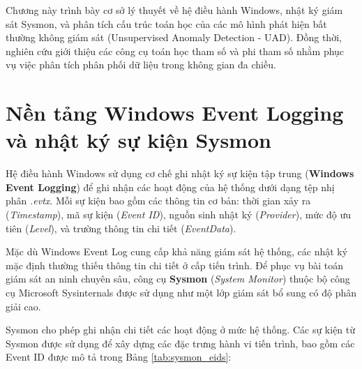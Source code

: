 \documentclass[../main.tex]{subfiles}
\begin{document}
Chương này trình bày cơ sở lý thuyết về hệ điều hành Windows, nhật ký giám sát Sysmon, và phân tích cấu trúc toán học của các mô hình phát hiện bất thường không giám sát (Unsupervised Anomaly Detection - UAD). Đồng thời, nghiên cứu giới thiệu các công cụ toán học tham số và phi tham số nhằm phục vụ việc phân tích phân phối dữ liệu trong không gian đa chiều.

\section{Nền tảng Windows Event Logging và nhật ký sự kiện Sysmon}
\label{section:1.1}

Hệ điều hành Windows sử dụng cơ chế ghi nhật ký sự kiện tập trung (\textbf{Windows Event Logging}) để ghi nhận các hoạt động của hệ thống dưới dạng tệp nhị phân \textit{.evtx}. Mỗi sự kiện bao gồm các thông tin cơ bản: thời gian xảy ra (\textit{Timestamp}), mã sự kiện (\textit{Event ID}), nguồn sinh nhật ký (\textit{Provider}), mức độ ưu tiên (\textit{Level}), và trường thông tin chi tiết (\textit{EventData}). 

Mặc dù Windows Event Log cung cấp khả năng giám sát hệ thống, các nhật ký mặc định thường thiếu thông tin chi tiết ở cấp tiến trình. Để phục vụ bài toán giám sát an ninh chuyên sâu, công cụ \textbf{Sysmon} (\textit{System Monitor}) thuộc bộ công cụ Microsoft Sysinternals được sử dụng như một lớp giám sát bổ sung có độ phân giải cao.

Sysmon cho phép ghi nhận chi tiết các hoạt động ở mức hệ thống. Các sự kiện từ Sysmon được sử dụng để xây dựng các đặc trưng hành vi tiến trình, bao gồm các Event ID được mô tả trong Bảng \ref{tab:sysmon_eids}:
\end{document}
